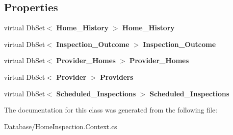 \subsection*{Properties}
\begin{DoxyCompactItemize}
\item 
\mbox{\label{class_a_f_h___scheduler_1_1_database_1_1_home_inspection_entities_a44cdbe689150ad097e9b3b2e95b18148}} 
virtual Db\+Set$<$ \textbf{ Home\+\_\+\+History} $>$ {\bfseries Home\+\_\+\+History}\hspace{0.3cm}{\ttfamily  [get, set]}
\item 
\mbox{\label{class_a_f_h___scheduler_1_1_database_1_1_home_inspection_entities_a02ab6d30def687f9c4a3e9cc2a4d44d3}} 
virtual Db\+Set$<$ \textbf{ Inspection\+\_\+\+Outcome} $>$ {\bfseries Inspection\+\_\+\+Outcome}\hspace{0.3cm}{\ttfamily  [get, set]}
\item 
\mbox{\label{class_a_f_h___scheduler_1_1_database_1_1_home_inspection_entities_a56ef6b73ef39f67c672a74dd51e0ed24}} 
virtual Db\+Set$<$ \textbf{ Provider\+\_\+\+Homes} $>$ {\bfseries Provider\+\_\+\+Homes}\hspace{0.3cm}{\ttfamily  [get, set]}
\item 
\mbox{\label{class_a_f_h___scheduler_1_1_database_1_1_home_inspection_entities_a4d2decae1501959a08e419d784a45ce4}} 
virtual Db\+Set$<$ \textbf{ Provider} $>$ {\bfseries Providers}\hspace{0.3cm}{\ttfamily  [get, set]}
\item 
\mbox{\label{class_a_f_h___scheduler_1_1_database_1_1_home_inspection_entities_ae1ac6e0bd1dd234240a5dd99a5923383}} 
virtual Db\+Set$<$ \textbf{ Scheduled\+\_\+\+Inspections} $>$ {\bfseries Scheduled\+\_\+\+Inspections}\hspace{0.3cm}{\ttfamily  [get, set]}
\end{DoxyCompactItemize}


The documentation for this class was generated from the following file\+:\begin{DoxyCompactItemize}
\item 
Database/Home\+Inspection.\+Context.\+cs\end{DoxyCompactItemize}
